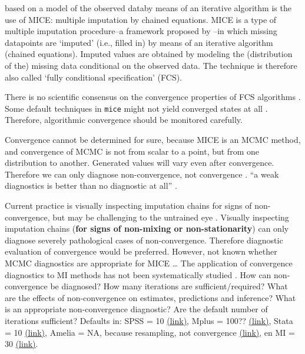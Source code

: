 \documentclass[Royal,times,sageh]{sagej}
\begin{document}
based on a model of the observed databy means of an iterative algorithm
is the use of MICE: multiple imputation by chained equations. MICE is a
type of multiple imputation procedure--a framework proposed by
\citet{rubin87}--in which missing datapoints are `imputed' (i.e., filled
in) by means of an iterative algorithm (chained equations). Imputed
values are obtained by modeling the (distribution of the) missing data
conditional on the observed data. The technique is therefore also called
`fully conditional specification' (FCS).

There is no scientific consensus on the convergence properties of FCS
algorithms \citep{taka17}. Some default techniques in \texttt{mice}
might not yield converged states at all \citep{murr18}. Therefore,
algorithmic convergence should be monitored carefully.

Convergence cannot be determined for sure, because MICE is an MCMC
method, and convergence of MCMC is not from scalar to a point, but from
one distribution to another. Generated values will vary even after
convergence. Therefore we can only diagnose non-convergence, not
convergence \citep{hoff09}. ``a weak diagnostics is better than no
diagnostic at all'' \citep{cowl96}.

Current practice is visually inspecting imputation chains for signs of
non-convergence, but may be challenging to the untrained eye
\citep[\(\S\) 6.5.2]{buur18}. Visually inspecting imputation chains
(\textbf{for signs of non-mixing or non-stationarity}) can only diagnose
severely pathological cases of non-convergence. Therefore diagnostic
evaluation of convergence would be preferred. However, not known whether
MCMC diagnostics are appropriate for MICE \ldots{} The application of
convergence diagnostics to MI methods has not been systematically
studied \citep{buur18}. How can non-convergence be diagnosed? How many
iterations are sufficient/required? What are the effects of
non-convergence on estimates, predictions and inference? What is an
appropriate non-convergence diagnostic? Are the default number of
iterations sufficient? Defaults in: SPSS = 10
\href{https://www.ibm.com/support/knowledgecenter/SSLVMB_24.0.0/spss/mva/syn_multiple_imputation_impute.html}{(link)},
Mplus = 100??
\href{https://pdfs.semanticscholar.org/e20e/29e008592cbfbaa567931f74cdfdb5451405.pdf?_ga=2.55354671.54033656.1584698748-527613517.1584698748}{(link)},
Stata = 10
\href{https://www.stata.com/manuals13/mi.pdf,\%20p.\%20139}{(link)},
Amelia = NA, because resampling, not convergence
\href{https://cran.r-project.org/web/packages/Amelia/Amelia.pdf}{(link)},
en MI = 30
\href{https://cran.r-project.org/web/packages/mi/mi.pdf}{(link)}.
\end{document}
